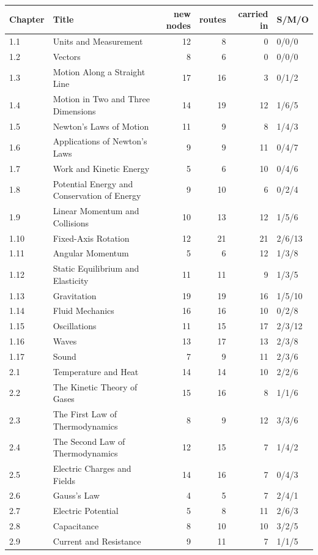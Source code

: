 \begin{longtable}{@{}llrrrl@{}}\toprule
Chapter & Title & new nodes & routes & carried in & S/M/O \\\midrule\endhead
1.1 & Units and Measurement & 12 & 8 & 0 & 0/0/0 \\
1.2 & Vectors & 8 & 6 & 0 & 0/0/0 \\
1.3 & Motion Along a Straight Line & 17 & 16 & 3 & 0/1/2 \\
1.4 & Motion in Two and Three Dimensions & 14 & 19 & 12 & 1/6/5 \\
1.5 & Newton's Laws of Motion & 11 & 9 & 8 & 1/4/3 \\
1.6 & Applications of Newton's Laws & 9 & 9 & 11 & 0/4/7 \\
1.7 & Work and Kinetic Energy & 5 & 6 & 10 & 0/4/6 \\
1.8 & Potential Energy and Conservation of Energy & 9 & 10 & 6 & 0/2/4 \\
1.9 & Linear Momentum and Collisions & 10 & 13 & 12 & 1/5/6 \\
1.10 & Fixed-Axis Rotation & 12 & 21 & 21 & 2/6/13 \\
1.11 & Angular Momentum & 5 & 6 & 12 & 1/3/8 \\
1.12 & Static Equilibrium and Elasticity & 11 & 11 & 9 & 1/3/5 \\
1.13 & Gravitation & 19 & 19 & 16 & 1/5/10 \\
1.14 & Fluid Mechanics & 16 & 16 & 10 & 0/2/8 \\
1.15 & Oscillations & 11 & 15 & 17 & 2/3/12 \\
1.16 & Waves & 13 & 17 & 13 & 2/3/8 \\
1.17 & Sound & 7 & 9 & 11 & 2/3/6 \\
2.1 & Temperature and Heat & 14 & 14 & 10 & 2/2/6 \\
2.2 & The Kinetic Theory of Gases & 15 & 16 & 8 & 1/1/6 \\
2.3 & The First Law of Thermodynamics & 8 & 9 & 12 & 3/3/6 \\
2.4 & The Second Law of Thermodynamics & 12 & 15 & 7 & 1/4/2 \\
2.5 & Electric Charges and Fields & 14 & 16 & 7 & 0/4/3 \\
2.6 & Gauss's Law & 4 & 5 & 7 & 2/4/1 \\
2.7 & Electric Potential & 5 & 8 & 11 & 2/6/3 \\
2.8 & Capacitance & 8 & 10 & 10 & 3/2/5 \\
2.9 & Current and Resistance & 9 & 11 & 7 & 1/1/5 \\

\end{longtable}
